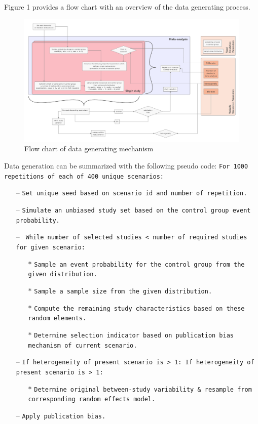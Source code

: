 \documentclass[
  english,
  doc,floatsintext,draftall]{apa6}
\begin{document}
Figure 1 provides a flow chart with an overview of the data generating process.

\begin{figure}
\centering
\includegraphics[width=6.14583in,height=\textheight]{../figures/flow_chart.png}
\caption{Flow chart of data generating mechanism}
\end{figure}

Data generation can be summarized with the following pseudo code:
\FloatBarrier
\texttt{For 1000 repetitions of each of 400 unique scenarios:}

\begin{itemize}[leftmargin=*] 
    \item[--] \texttt{Set unique seed based on scenario id and number of repetition.}
    \item[--] \texttt{Simulate an unbiased study set based on the control group event probability.}
    \item[--] \texttt{ While number of selected studies < number of required studies for given scenario:}
    \begin{itemize}
      \item[$\ast$] \texttt{Sample an event probability for the control group from the given distribution.}
      \item[$\ast$] \texttt{Sample a sample size from the given distribution.}
      \item[$\ast$] \texttt{Compute the remaining study characteristics based on these random elements.}
      \item[$\ast$] \texttt{Determine selection indicator based on publication bias mechanism of current scenario.}
    \end{itemize}
    \item[--] \texttt{If heterogeneity of present scenario is > 1: If heterogeneity of present scenario is > 1:}
    \begin{itemize}
      \item[$\ast$] \texttt{Determine original between-study variability \& resample from corresponding random effects model.}
    \end{itemize}
    \item[--] \texttt{Apply publication bias.}
\end{itemize}
\end{document}
